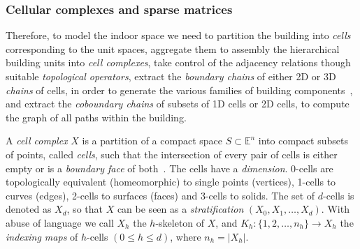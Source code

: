 \documentclass[]{egpubl}
\def\E{\mathbb{E}}
\begin{document}
\subsubsection*{Cellular complexes and sparse matrices} 

Therefore, to model the indoor space we need to partition the building into \emph{cells} corresponding to the unit spaces, aggregate them to assembly the hierarchical  building units into \emph{cell complexes}, take control of the adjacency relations though suitable \emph{topological operators}, extract the \emph{boundary chains} of either 2D or 3D \emph{chains} of cells, in order to generate the various families of building components~\cite{paoluzziMS:2014}, and extract the \emph{coboundary chains} of subsets of 1D cells or 2D cells, to compute the graph of all paths within the building.

A \emph{cell complex} $X$ is a partition of a compact space $S \subset \E^n$ into compact subsets of points, called \emph{cells}, such that the intersection of every pair of cells is either empty or is a \emph{boundary face} of both~\cite{hatcher:2002,ghrist:2014}. The cells have a \emph{dimension}. 0-cells are topologically equivalent (homeomorphic) to single points (vertices), 1-cells to curves (edges), 2-cells to surfaces (faces) and 3-cells to solids.  The set of $d$-cells is denoted as $X_d$, so that $X$ can be seen as a \emph{stratification} $(X_0, X_1, \ldots, X_d)$. With abuse of language we call $X_h$ the $h$-skeleton of $X$, and $K_h: \{1,2,\ldots,n_h\} \to X_h$ the \emph{indexing maps} of $h$-cells $(0\leq h\leq d)$, where $n_h=|X_h|$. 


\end{document}
